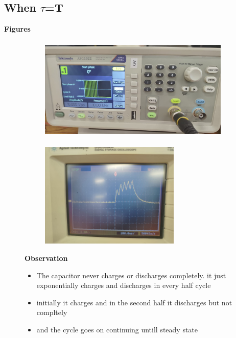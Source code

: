 \documentclass[a4paper,12pt]{article}
\begin{document}
\subsection{When $\tau$=T}
\begin{itemize}
    \item \textbf{Figures}
    \begin{figure}[H]
    \centering
    \begin{subfigure}{0.48\textwidth}
        \centering
        \includegraphics[height=5cm]{figs/transinputrc==t.jpeg}
    \end{subfigure}
    \hspace{0.04\textwidth} %
    \begin{subfigure}{0.48\textwidth}
        \centering
        \includegraphics[height=5cm]{figs/transoutputrc==t.jpeg}
    \end{subfigure}
    \item \textbf{Observation}
    \begin{itemize}
        \item The capacitor never charges or discharges completely. it just exponentially charges and discharges in every half cycle
        \item initially it charges and in the second half it discharges but not compltely
        \item and the cycle goes on continuing untill steady state
    \end{itemize}
\end{figure}
\end{itemize}
\newpage
\end{document}
